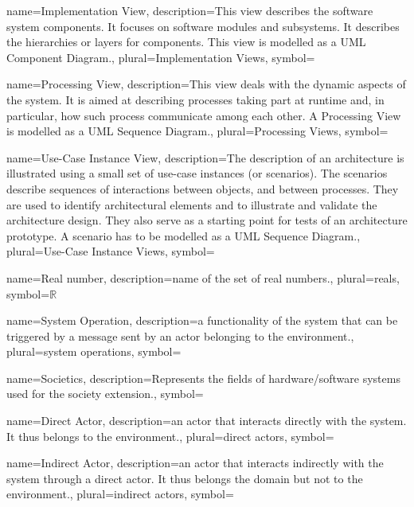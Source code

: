 {name={Implementation View},
description={This view describes the software system components. It focuses on
software modules and subsystems. It describes the hierarchies or layers for
components. This view is modelled as a UML Component Diagram.},
plural={Implementation Views}, 
symbol={}
}


{name={Processing View},
description={This view deals with the dynamic aspects of the system. It is
aimed at describing processes taking part at runtime and, in particular, how
such process communicate among each other. A Processing View is modelled as a
UML Sequence Diagram.},
plural={Processing Views}, 
symbol={}
}


{name={Use-Case Instance View},
description={The description of an architecture is illustrated using a small set
of use-case instances (or scenarios). The scenarios describe sequences of
interactions between objects, and between processes. They are used to identify
architectural elements and to illustrate and validate the architecture design.
They also serve as a starting point for tests of an architecture prototype. A
scenario has to be modelled as a UML Sequence Diagram.}, 
plural={Use-Case Instance Views}, 
symbol={}
}

{name={Real number},
description={name of the set of real numbers.},
plural={reals},
symbol={\ensuremath{\mathbb{R}}}
}

{name={System Operation},
description={a functionality of the system that can be triggered by a message
sent by an actor belonging to the environment.}, plural={system operations},
symbol={}
}


{name={Societics},
description={Represents the fields of hardware/software
systems used for the society extension.}, 
symbol={}
}

{name={Direct Actor},
description={an actor that interacts directly with the system. It thus belongs
to the environment.},
plural={direct actors},
symbol={}
}

{name={Indirect Actor},
description={an actor that interacts indirectly with the system through a direct
actor.  It thus belongs the domain but not to the environment.}, 
plural={indirect actors},
symbol={}
}

